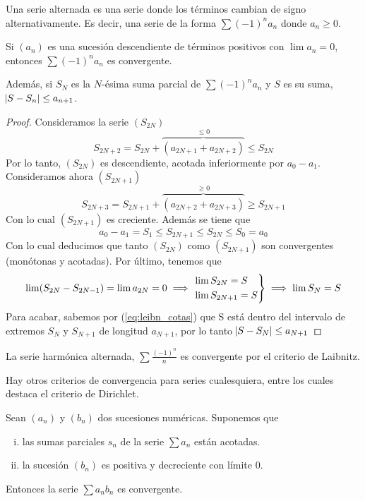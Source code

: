 \begin{defi}
	Una serie alternada es una serie donde los términos cambian de signo alternativamente.
	Es decir, una serie de la forma $\sum (-1)^n a_n$ donde $a_n \geq 0$.
\end{defi}

\begin{prop}
	Si $(a_n)$ es una sucesión descendiente de términos positivos con $\lim a_n = 0$,
	entonces  $\sum (-1)^n a_n$ es convergente.

	Además, si $S_N$ es la $N$-ésima suma parcial de $\sum (-1)^n a_n$ y
	$S$ es su suma, $\abs{S - S_n} \leq a_{n+1}$.
\end{prop}

\begin{proof}
	Consideramos la serie $(S_{2N})$
	\[
		S_{2N+2} = S_{2N} + \overbrace{(a_{2N+1} + a_{2N+2})}^{\leq 0} \leq S_{2N}
	\]
	Por lo tanto, $(S_{2N})$ es descendiente, acotada inferiormente por $a_0 - a_1$.
	Consideramos ahora $(S_{2N+1})$
	\[
		S_{2N+3} = S_{2N+1} + \overbrace{(a_{2N+2} + a_{2N+3})}^{\geq 0} \geq S_{2N+1}
	\]
	Con lo cual $(S_{2N+1})$ es creciente. Además se tiene que
	\begin{equation}\label{eq:leibn_cotas}
		a_0 - a_1 = S_1 \leq S_{2N+1} \leq S_{2N} \leq S_0 = a_0
	\end{equation}
	Con lo cual deducimos que tanto $(S_{2N})$ como $(S_{2N+1})$ son convergentes
	(monótonas y acotadas). Por último, tenemos que
	\[
		\lim (S_{2N} - S_{2N-1}) = \lim a_{2N} = 0 \implies \begin{rcases}
			\lim S_{2N} = S \\ \lim S_{2N+1} = S
		\end{rcases} \implies \lim S_N = S
	\]
	Para acabar, sabemos por (\ref{eq:leibn_cotas}) que S está dentro del intervalo
	de extremos $S_{N}$ y $S_{N+1}$ de longitud $a_{N+1}$, por lo tanto
	$\abs{S - S_N} \leq a_{N+1}$
\end{proof}

\begin{example*}
	La serie harmónica alternada, $\sum \frac{(-1)^n}{n}$ es convergente por el
	criterio de Laibnitz.
\end{example*}

Hay otros criterios de convergencia para series cualesquiera, entre los cuales
destaca el criterio de Dirichlet.

\begin{prop}
	Sean $(a_n)$ y $(b_n)$ dos sucesiones numéricas. Suponemos que
	\begin{enumerate}[i)]
		\item las sumas parciales $s_n$ de la serie $\sum a_n$ están acotadas.
		\item la sucesión $(b_n)$ es positiva y decreciente con límite 0.
	\end{enumerate}
	Entonces la serie $\sum a_nb_n$ es convergente.
\end{prop}

